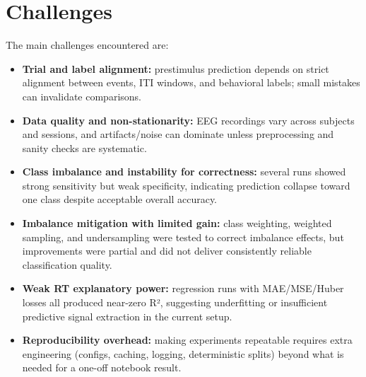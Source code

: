\section{Challenges}
The main challenges encountered are:
\begin{itemize}
    \item \textbf{Trial and label alignment:} prestimulus prediction depends on strict alignment between events, ITI windows, and behavioral labels; small mistakes can invalidate comparisons.
    \item \textbf{Data quality and non-stationarity:} EEG recordings vary across subjects and sessions, and artifacts/noise can dominate unless preprocessing and sanity checks are systematic.
    \item \textbf{Class imbalance and instability for correctness:} several runs showed strong sensitivity but weak specificity, indicating prediction collapse toward one class despite acceptable overall accuracy.
    \item \textbf{Imbalance mitigation with limited gain:} class weighting, weighted sampling, and undersampling were tested to correct imbalance effects, but improvements were partial and did not deliver consistently reliable classification quality.
    \item \textbf{Weak RT explanatory power:} regression runs with MAE/MSE/Huber losses all produced near-zero R², suggesting underfitting or insufficient predictive signal extraction in the current setup.
    \item \textbf{Reproducibility overhead:} making experiments repeatable requires extra engineering (configs, caching, logging, deterministic splits) beyond what is needed for a one-off notebook result.
\end{itemize}

